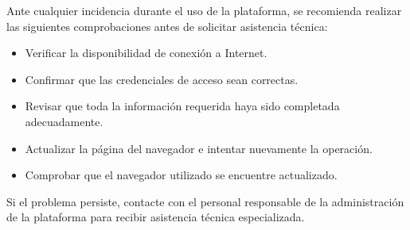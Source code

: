 \documentclass[12pt,a4paper]{report}
\begin{document}
Ante cualquier incidencia durante el uso de la plataforma, se recomienda realizar las siguientes comprobaciones antes de solicitar asistencia técnica:

\begin{itemize}
\item Verificar la disponibilidad de conexión a Internet.
\item Confirmar que las credenciales de acceso sean correctas.
\item Revisar que toda la información requerida haya sido completada adecuadamente.
\item Actualizar la página del navegador e intentar nuevamente la operación.
\item Comprobar que el navegador utilizado se encuentre actualizado.
\end{itemize}

Si el problema persiste, contacte con el personal responsable de la administración de la plataforma para recibir asistencia técnica especializada.
\end{document}
